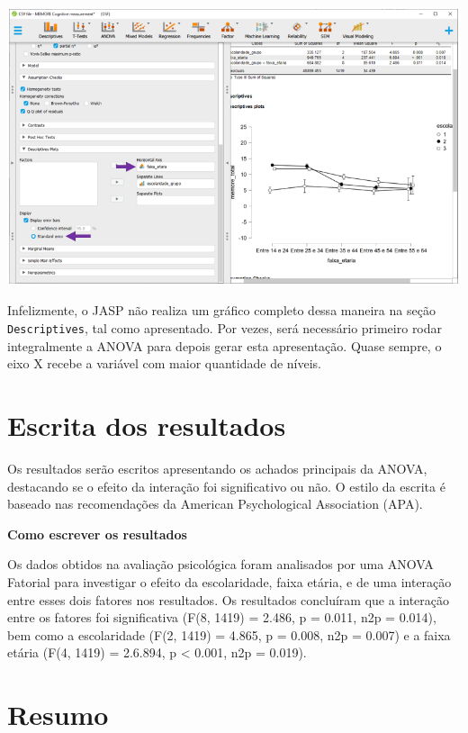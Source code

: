 \documentclass[
]{book}
\begin{document}
\includegraphics{./img/cap_anova_fatorial_descriptives_final.png}

Infelizmente, o JASP não realiza um gráfico completo dessa maneira na seção \texttt{Descriptives}, tal como apresentado. Por vezes, será necessário primeiro rodar integralmente a ANOVA para depois gerar esta apresentação. Quase sempre, o eixo X recebe a variável com maior quantidade de níveis.

\hypertarget{escrita-dos-resultados-8}{%
\section{Escrita dos resultados}\label{escrita-dos-resultados-8}}

Os resultados serão escritos apresentando os achados principais da ANOVA, destacando se o efeito da interação foi significativo ou não. O estilo da escrita é baseado nas recomendações da American Psychological Association (APA).

\textbf{Como escrever os resultados}

Os dados obtidos na avaliação psicológica foram analisados por uma ANOVA Fatorial para investigar o efeito da escolaridade, faixa etária, e de uma interação entre esses dois fatores nos resultados. Os resultados concluíram que a interação entre os fatores foi significativa (F(8, 1419) = 2.486, p = 0.011, n2p = 0.014), bem como a escolaridade (F(2, 1419) = 4.865, p = 0.008, n2p = 0.007) e a faixa etária (F(4, 1419) = 2.6.894, p \textless{} 0.001, n2p = 0.019).

\hypertarget{resumo-11}{%
\section{Resumo}\label{resumo-11}}
\end{document}
